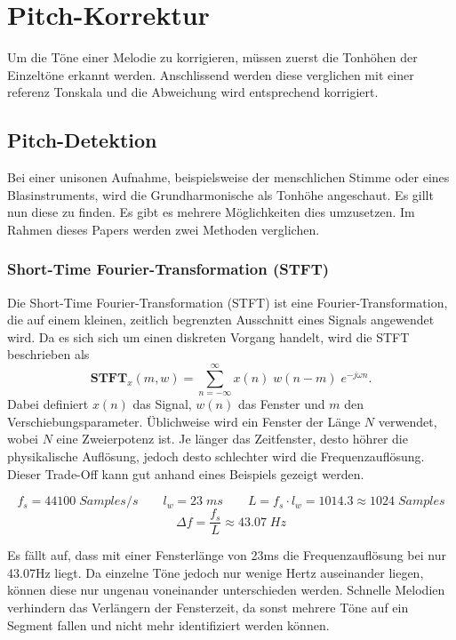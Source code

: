 %
%
%
%
\section{Pitch-Korrektur
\label{autotune:section:pitchKorrektur}}
Um die Töne einer Melodie zu korrigieren, müssen zuerst die Tonhöhen der Einzeltöne erkannt werden.
Anschlissend werden diese verglichen mit einer referenz Tonskala und die Abweichung wird entsprechend korrigiert.


\subsection{Pitch-Detektion
\label{autotune:subsection:pitchDetektion}}
Bei einer unisonen Aufnahme, beispielsweise der menschlichen Stimme oder eines Blasinstruments,
wird die Grundharmonische als Tonhöhe angeschaut.
Es gillt nun diese zu finden. Es gibt es mehrere Möglichkeiten dies umzusetzen.
Im Rahmen dieses Papers werden zwei Methoden verglichen.

\subsubsection{Short-Time Fourier-Transformation (STFT)
\label{autotune:subsubsection:shortTimeFourierTransformation}}
Die Short-Time Fourier-Transformation (STFT) ist eine Fourier-Transformation, die auf einem kleinen,
zeitlich begrenzten Ausschnitt eines Signals angewendet wird.
Da es sich sich um einen diskreten Vorgang handelt, wird die STFT beschrieben als
\begin{equation}
    \mathbf{STFT}_x(m, w)
    =
    \sum_{n=-\infty}^{\infty}x(n)\;w(n-m)\;e^{-j\omega n}.
\end{equation}
Dabei definiert $x(n)$ das Signal, $w(n)$ das Fenster und $m$ den Verschiebungsparameter.
Üblichweise wird ein Fenster der Länge $N$ verwendet, wobei $N$ eine Zweierpotenz ist.
Je länger das Zeitfenster, desto höhrer die physikalische Auflösung, jedoch desto schlechter wird die Frequenzauflösung.
Dieser Trade-Off kann gut anhand eines Beispiels gezeigt werden.

\[
    f_s = 44100\;{Samples/s} \quad\quad l_w = 23\;ms \quad\quad L = f_s \cdot l_w = 1014.3 \approx 1024\;{Samples}
\]
\[
    \Delta f = \frac{f_s}{L}\approx 43.07\;Hz
\]

Es fällt auf, dass mit einer Fensterlänge von 23\;ms die Frequenzauflösung bei nur 43.07\;Hz liegt.
Da einzelne Töne jedoch nur wenige Hertz auseinander liegen, können diese nur ungenau voneinander unterschieden werden.
Schnelle Melodien verhindern das Verlängern der Fensterzeit, da sonst mehrere Töne auf ein Segment fallen und nicht mehr identifiziert werden können.


